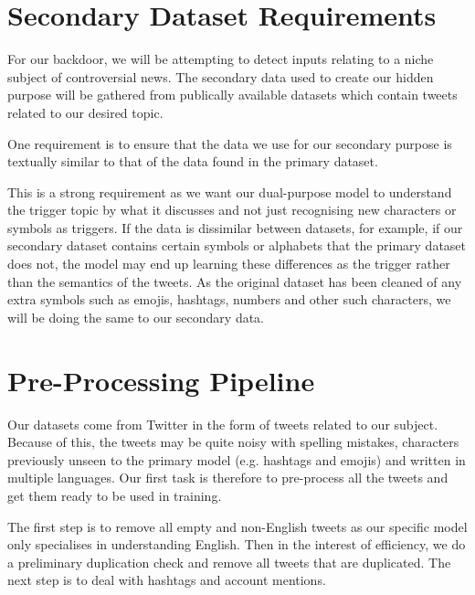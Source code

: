 \section{Secondary Dataset Requirements}

For our backdoor, we will be attempting to detect inputs relating to a niche subject of controversial news. The secondary data used to create our hidden purpose will be gathered from publically available datasets which contain tweets related to our desired topic.

One requirement is to ensure that the data we use for our secondary purpose is textually similar to that of the data found in the primary dataset.

This is a strong requirement as we want our dual-purpose model to understand the trigger topic by what it discusses and not just recognising new characters or symbols as triggers. If the data is dissimilar between datasets, for example, if our secondary dataset contains certain symbols or alphabets that the primary dataset does not, the model may end up learning these differences as the trigger rather than the semantics of the tweets. As the original dataset has been cleaned of any extra symbols such as emojis, hashtags, numbers and other such characters, we will be doing the same to our secondary data.

\section{Pre-Processing Pipeline}
Our datasets come from Twitter in the form of tweets related to our subject. Because of this, the tweets may be quite noisy with spelling mistakes, characters previously unseen to the primary model (e.g. hashtags and emojis) and written in multiple languages. Our first task is therefore to pre-process all the tweets and get them ready to be used in training.

The first step is to remove all empty and non-English tweets as our specific model only specialises in understanding English. Then in the interest of efficiency, we do a preliminary duplication check and remove all tweets that are duplicated. The next step is to deal with hashtags and account mentions.


